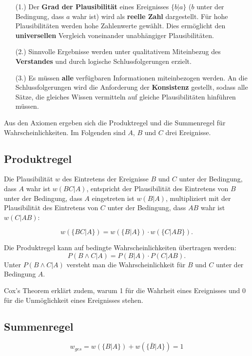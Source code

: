 \documentclass[]{dsadokumentation}
\begin{document}
{
\begin{itemize}
 \item[(1.)] Der \textbf{Grad der Plausibilität} eines Ereignisses $\{b|a\}$ ($b$ unter der Bedingung, dass $a$ wahr ist) wird als \textbf {reelle Zahl} dargestellt. Für hohe Plausibilitäten werden hohe Zahlenwerte gewählt. Dies ermöglicht den \textbf {universellen} Vergleich voneinander unabhängiger Plausibilitäten.

 \item[(2.)] Sinnvolle Ergebnisse werden unter qualitativem Miteinbezug des \textbf {Verstandes} und durch logische Schlussfolgerungen erzielt.
 \item[(3.)] Es müssen \textbf {alle }verfügbaren Informationen miteinbezogen werden. An die Schlussfolgerungen wird die Anforderung der \textbf {Konsistenz }gestellt, sodass alle Sätze, die gleiches Wissen vermitteln auf gleiche Plausibilitäten hinführen müssen.
\end{itemize}
}
Aus den Axiomen ergeben sich die Produktregel und die Summenregel für Wahrscheinlichkeiten. Im Folgenden sind $A$, $B$ und $C$ drei Ereignisse.

\subsection{Produktregel}

Die Plausibilität $w$ des Eintretens der Ereignisse $B$ und $C$ unter der Bedingung, dass $A$ wahr ist $w(BC|A)$,
entspricht der Plausibilität des Eintretens von $B$ unter der Bedingung, dass $A$ eingetreten ist $w(B|A)$,
multipliziert mit der Plausibilität des Eintretens von $C$ unter der Bedingung, dass $AB$ wahr ist $w(C|AB)$:

\begin {displaymath}
w(\{BC|A\})=w(\{B|A\})\cdot w(\{C|AB\}) .
\end{displaymath}

\noindent Die Produktregel kann auf bedingte Wahrscheinlichkeiten übertragen werden:
\begin {displaymath}
P(B \wedge C|A) = P(B|A)\cdot P(C|AB).
\end{displaymath}
Unter $P(B \wedge C|A)$ versteht man die Wahrscheinlichkeit für $B$ und $C$ unter der Bedingung $A$.

Cox's Theorem erklärt zudem, warum 1 für die Wahrheit eines Ereignisses und 0 für die Unmöglichkeit eines Ereignisses stehen.

\subsection{Summenregel}
\begin{displaymath}
w_{ges}=w(\{B|A\}) + w(\{\bar{B}|A\})= 1
\end{displaymath}
\end{document}
